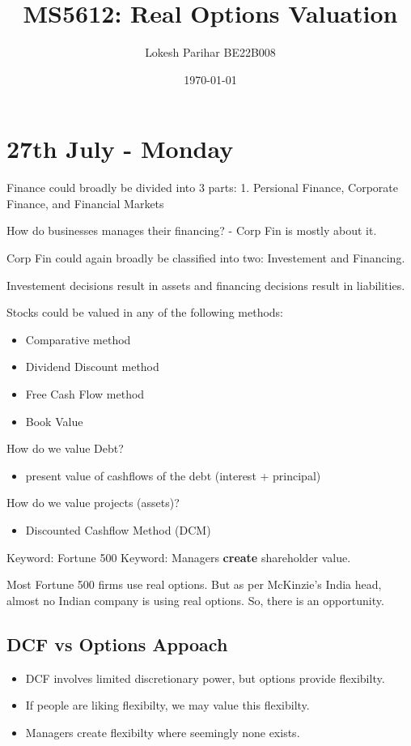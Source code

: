 \documentclass{article}
\title{MS5612: Real Options Valuation}
\author{Lokesh Parihar BE22B008}
\date{\today}
\begin{document}
\maketitle
\newpage
\tableofcontents
\newpage

\section{27th July - Monday}
Finance could broadly be divided into 3 parts:
1. Persional Finance, Corporate Finance, and Financial Markets

How do businesses manages their financing? - Corp Fin is mostly about it.

Corp Fin could again broadly be classified into two: Investement and Financing.

Investement decisions result in assets and financing decisions result in liabilities.

Stocks could be valued in any of the following methods:
\begin{itemize}
    \item Comparative method
    \item Dividend Discount method
    \item Free Cash Flow method
    \item Book Value
\end{itemize}

How do we value Debt?
\begin{itemize}
    \item present value of cashflows of the debt (interest + principal)
\end{itemize}

How do we value projects (assets)?
\begin{itemize}
    \item Discounted Cashflow Method (DCM)
\end{itemize}

Keyword: Fortune 500
Keyword: Managers \textbf{create} shareholder value.

Most Fortune 500 firms use real options. But as per McKinzie's India head, almost no Indian company is using real options.
So, there is an opportunity.

\subsection{DCF vs Options Appoach}
\begin{itemize}
    \item DCF involves limited discretionary power, but options provide flexibilty.
    \item If people are liking flexibilty, we may value this flexibilty.
    \item Managers create flexibilty where seemingly none exists.
\end{itemize}
\end{document}
